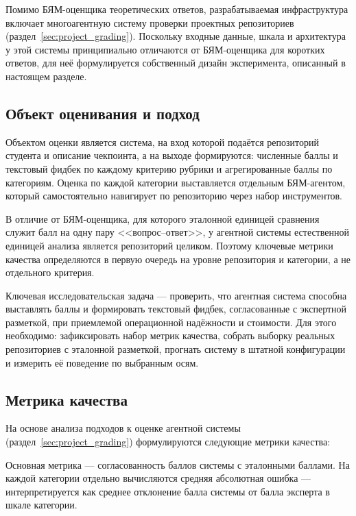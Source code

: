 Помимо БЯМ-оценщика теоретических ответов, разрабатываемая
инфраструктура включает многоагентную систему проверки проектных
репозиториев (раздел~\ref{sec:project_grading}). Поскольку входные
данные, шкала и архитектура у этой системы принципиально отличаются от
БЯМ-оценщика для коротких ответов, для неё формулируется собственный дизайн
эксперимента, описанный в настоящем разделе.
 
\subsection{Объект оценивания и подход}
 
Объектом оценки является система, на вход которой подаётся репозиторий
студента и описание чекпоинта, а на выходе формируются: численные баллы
и текстовый фидбек
по каждому критерию рубрики и агрегированные баллы по категориям. Оценка по каждой категории
выставляется отдельным БЯМ-агентом, который самостоятельно навигирует
по репозиторию через набор инструментов. 

В отличие от БЯМ-оценщика, для которого эталонной единицей сравнения служит
балл на одну пару <<вопрос--ответ>>, у агентной системы естественной
единицей анализа является репозиторий целиком. Поэтому ключевые
метрики качества определяются в первую очередь на уровне репозитория и
категории, а не отдельного критерия.

Ключевая исследовательская задача --- проверить, что агентная система
способна выставлять баллы и формировать текстовый фидбек, согласованные
с экспертной разметкой, при приемлемой операционной надёжности и
стоимости. Для этого необходимо: зафиксировать набор метрик качества,
собрать выборку реальных репозиториев с эталонной разметкой, прогнать
систему в штатной конфигурации и измерить её поведение по выбранным
осям.

\subsection{Метрика качества}
 
На основе анализа подходов к оценке агентной системы (раздел~\ref{sec:project_grading}) формулируются следующие метрики качества:
 
Основная метрика ---
согласованность баллов системы с эталонными баллами. На каждой
категории отдельно вычисляются средняя абсолютная ошибка --- 
интерпретируется как среднее отклонение балла системы от балла
эксперта в шкале категории.

